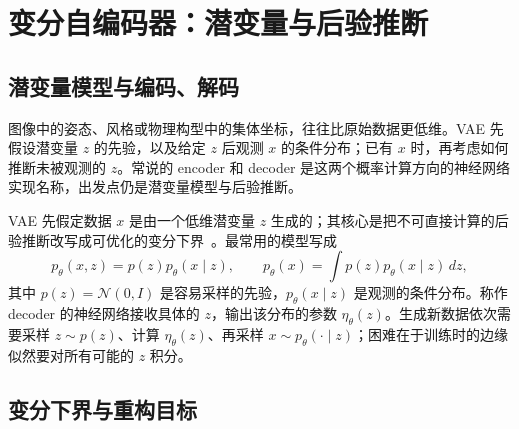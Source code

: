 \section{变分自编码器：潜变量与后验推断}

\subsection{潜变量模型与编码、解码}

图像中的姿态、风格或物理构型中的集体坐标，往往比原始数据更低维。VAE 先假设潜变量 \(z\) 的先验，以及给定 \(z\) 后观测 \(x\) 的条件分布；已有 \(x\) 时，再考虑如何推断未被观测的 \(z\)。常说的 encoder 和 decoder 是这两个概率计算方向的神经网络实现名称，出发点仍是潜变量模型与后验推断。

VAE 先假定数据 \(x\) 是由一个低维潜变量 \(z\) 生成的；其核心是把不可直接计算的后验推断改写成可优化的变分下界~\cite{kingma2013vae,rezende2014stochastic}。最常用的模型写成
\begin{equation}
 p_\theta(x,z)=p(z)p_\theta(x\mid z),\qquad
 p_\theta(x)=\int p(z)p_\theta(x\mid z)\,dz,
\end{equation}
其中 \(p(z)=\mathcal N(0,I)\) 是容易采样的先验，\(p_\theta(x\mid z)\) 是观测的条件分布。称作 decoder 的神经网络接收具体的 \(z\)，输出该分布的参数 \(\eta_\theta(z)\)。生成新数据依次需要采样 \(z\sim p(z)\)、计算 \(\eta_\theta(z)\)、再采样 \(x\sim p_\theta(\cdot\mid z)\)；困难在于训练时的边缘似然要对所有可能的 \(z\) 积分。

\subsection{变分下界与重构目标}

